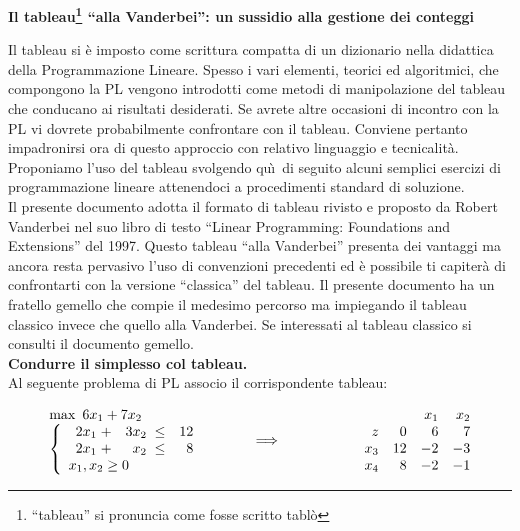 \documentclass[10pt]{article}
\begin{document}
\begin{center}
   {\LARGE \bf Il tableau\footnote{``tableau'' si pronuncia come fosse scritto tabl\`o} ``alla Vanderbei'': un sussidio alla gestione dei conteggi}
\end{center}

Il tableau si \`e imposto come scrittura compatta di
un dizionario nella didattica della 
Programmazione Lineare.
Spesso i vari elementi,
teorici ed algoritmici,
che compongono la PL
vengono introdotti come metodi
di manipolazione del tableau che conducano
ai risultati desiderati.
Se avrete altre occasioni di incontro con la PL 
vi dovrete probabilmente confrontare
con il tableau.
Conviene pertanto impadronirsi ora di questo approccio
con relativo linguaggio e tecnicalit\`a.
Proponiamo l'uso del tableau
svolgendo qu\`\i\ di seguito alcuni
semplici esercizi di programmazione lineare attenendoci a procedimenti standard di soluzione.\\

Il presente documento adotta il formato di tableau rivisto e proposto da Robert Vanderbei nel suo libro di testo ``Linear Programming: Foundations and Extensions'' del 1997. Questo tableau ``alla Vanderbei'' presenta dei vantaggi ma ancora resta pervasivo l'uso di convenzioni precedenti ed \`e possibile ti capiter\`a di confrontarti con la versione ``classica'' del tableau.
Il presente documento ha un fratello gemello che compie il medesimo percorso
ma impiegando il tableau classico invece che quello alla Vanderbei.
Se interessati al tableau classico si consulti il documento gemello.\\


\medskip
\noindent
{\large \bf Condurre il simplesso col tableau.}\\

Al seguente problema di PL associo il corrispondente tableau:

\[
   \begin{array}{l}
        \max \mbox{\ }6x_1 + 7x_2\\
        \left\{
        \begin{array}{l}
        \begin{array}{rrr}
            2x_1 \;+& 3x_2 \;\leq &   12 \\
            2x_1 \;+&  x_2 \;\leq &    8 \\
        \end{array} \\
        x_1, x_2  \geq 0    
        \end{array}
        \right.
   \end{array}
\hfill
\hspace{1cm}
{\Huge \Longrightarrow}
\hfill
\hspace{2cm}
   \begin{array}{rrrr}
         &		& x_1  & x_2  \\
       z  & 0 & 6 &   7 \\         
      x_3 &  12 &  -2 & -3 \\
      x_4 &  8 &  -2 &   -1 \\
   \end{array}
\]
\end{document}
